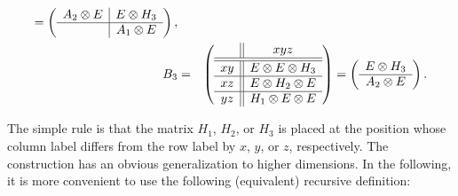 \documentclass[aps,prb,12pt,tightenlines,%
notitlepage,longbibliography]{revtex4-1}
\begin{document}
\begin{itemize}
\begin{eqnarray*}
                                           =\left(
                                           \begin{array}[c]{c|c}
                                             A_2\otimes E & E\otimes H_3\\
                                             \hline     
                                                          &  A_1\otimes E
                                           \end{array}
                                                            \right)
                                                            ,\\
    B_3&=&\left(
           \begin{array}[c]{c||c}
             &     xyz \\ \hline\hline 
             xy &    E\otimes E\otimes H_3   \\ \hline 
             xz &   E\otimes H_2\otimes E  \\  \hline 
             yz &    H_1\otimes E\otimes E
           \end{array}\right)=\left(
                  \begin{array}[c]{c}
                    E\otimes H_3   \\ \hline 
                    A_2\otimes E
                  \end{array}
    \right).
  \end{eqnarray*}
\end{itemize}
The simple rule is that the matrix $H_1$, $H_2$, or $H_3$ is placed at
the position whose column label differs from the row label by $x$,
$y$, or $z$, respectively.  The construction has an obvious
generalization to higher dimensions.  In the following, it is more
convenient to use the following (equivalent) recursive definition:
\end{document}

